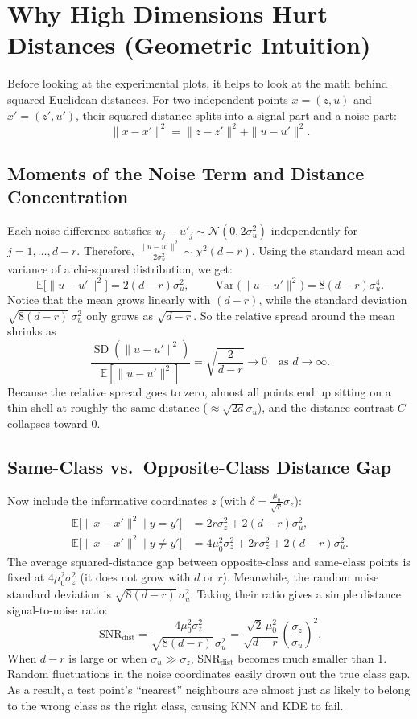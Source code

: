 \documentclass[11pt, a4paper]{article}
\begin{document}
\section{Why High Dimensions Hurt Distances (Geometric Intuition)}

Before looking at the experimental plots, it helps to look at the math behind squared Euclidean distances. For two independent points $x = (z, u)$ and $x' = (z', u')$, their squared distance splits into a signal part and a noise part:
\[
    \|x - x'\|^2 = \|z - z'\|^2 + \|u - u'\|^2.
\]

\subsection{Moments of the Noise Term and Distance Concentration}
Each noise difference satisfies $u_j - u'_j \sim \mathcal{N}(0, 2\sigma_u^2)$ independently for $j = 1, \dots, d-r$. Therefore, $\frac{\|u - u'\|^2}{2\sigma_u^2} \sim \chi^2(d-r)$. Using the standard mean and variance of a chi-squared distribution, we get:
\[
    \mathbb{E}\big[\|u - u'\|^2\big] = 2(d - r)\sigma_u^2, \qquad
    \operatorname{Var}\big(\|u - u'\|^2\big) = 8(d - r)\sigma_u^4.
\]
Notice that the mean grows linearly with $(d - r)$, while the standard deviation $\sqrt{8(d-r)}\,\sigma_u^2$ only grows as $\sqrt{d-r}$. So the relative spread around the mean shrinks as
\[
    \frac{\operatorname{SD}(\|u - u'\|^2)}{\mathbb{E}[\|u - u'\|^2]} = \sqrt{\frac{2}{d - r}} \longrightarrow 0 \quad \text{as } d \to \infty.
\]
Because the relative spread goes to zero, almost all points end up sitting on a thin shell at roughly the same distance ($\approx \sqrt{2d}\sigma_u$), and the distance contrast $C$ collapses toward 0.

\subsection{Same-Class vs.\ Opposite-Class Distance Gap}
Now include the informative coordinates $z$ (with $\delta = \frac{\mu_0}{\sqrt{r}}\sigma_z$):
\begin{align*}
    \mathbb{E}\big[\|x - x'\|^2 \mid y = y'\big] &= 2r\sigma_z^2 + 2(d - r)\sigma_u^2, \\
    \mathbb{E}\big[\|x - x'\|^2 \mid y \neq y'\big] &= 4\mu_0^2 \sigma_z^2 + 2r\sigma_z^2 + 2(d - r)\sigma_u^2.
\end{align*}
The average squared-distance gap between opposite-class and same-class points is fixed at $4\mu_0^2 \sigma_z^2$ (it does not grow with $d$ or $r$). Meanwhile, the random noise standard deviation is $\sqrt{8(d - r)}\,\sigma_u^2$. Taking their ratio gives a simple distance signal-to-noise ratio:
\[
    \text{SNR}_{\text{dist}}
    = \frac{4\mu_0^2 \sigma_z^2}{\sqrt{8(d - r)}\,\sigma_u^2}
    = \frac{\sqrt{2}\,\mu_0^2}{\sqrt{d - r}} \left(\frac{\sigma_z}{\sigma_u}\right)^2.
\]
When $d - r$ is large or when $\sigma_u \gg \sigma_z$, $\text{SNR}_{\text{dist}}$ becomes much smaller than 1. Random fluctuations in the noise coordinates easily drown out the true class gap. As a result, a test point's ``nearest'' neighbours are almost just as likely to belong to the wrong class as the right class, causing KNN and KDE to fail.
\end{document}
